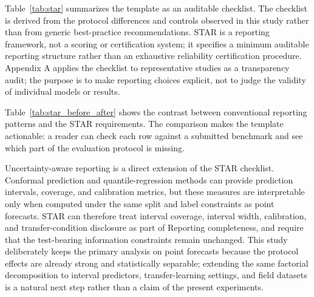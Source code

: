 \documentclass[pdflatex,sn-mathphys-num]{sn-jnl}
\begin{document}
Table~\ref{tab:star} summarizes the template as an auditable checklist. The checklist is derived from the protocol differences and controls observed in this study rather than from generic best-practice recommendations. STAR is a reporting framework, not a scoring or certification system; it specifies a minimum auditable reporting structure rather than an exhaustive reliability certification procedure. Appendix A applies the checklist to representative studies as a transparency audit; the purpose is to make reporting choices explicit, not to judge the validity of individual models or results.

\begin{table}[t]
\centering
\caption{STAR evaluation template used as an auditable reporting checklist.}
\label{tab:star}
\small
{}
\end{table}

Table~\ref{tab:star_before_after} shows the contrast between conventional reporting patterns and the STAR requirements. The comparison makes the template actionable: a reader can check each row against a submitted benchmark and see which part of the evaluation protocol is missing.

Uncertainty-aware reporting is a direct extension of the STAR checklist. Conformal prediction and quantile-regression methods \cite{mst2024cqr,icsrs2023splitconformal,phme2026conformal,eaai2025explainable} can provide prediction intervals, coverage, and calibration metrics, but these measures are interpretable only when computed under the same split and label constraints as point forecasts. STAR can therefore treat interval coverage, interval width, calibration, and transfer-condition disclosure as part of Reporting completeness, and require that the test-bearing information constraints remain unchanged. This study deliberately keeps the primary analysis on point forecasts because the protocol effects are already strong and statistically separable; extending the same factorial decomposition to interval predictors, transfer-learning settings, and field datasets is a natural next step rather than a claim of the present experiments.
\end{document}
